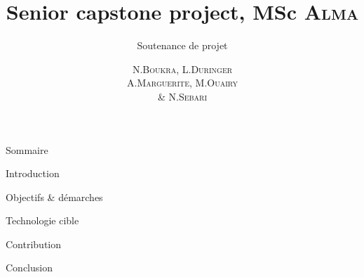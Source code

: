 \documentclass[HeilHazel,pdf,final,colorBG,slideColor]{prosper}
\title{\vspace{-0,5cm}Senior capstone project, MSc \textsc{Alma}}
\subtitle{Soutenance de projet}
\author{N.\textsc{Boukra}, L.\textsc{Duringer}\\
  A.\textsc{Marguerite},  M.\textsc{Ouairy}\\
  \& N.\textsc{Sebari}}
\begin{document}
\maketitle
\newcommand{\bc}{\begin{center}} 
\newcommand{\ec}{\end{center}} 
\newcommand{\bi}{\begin{Itemize}} 
\newcommand{\ei}{\end{Itemize}} 
\newcommand{\myitemm}{\item \texttt{[image: green-bullet-on-white]}}
\newcommand{\icongb}{\texttt{[image: green-bullet-on-white]}} 
\newcommand{\iconrb}{\texttt{[image: red-bullet-on-white]}} 

\newcommand{\itemg}{\item[\icongb{}]}
\newcommand{\itemr}{\item[\iconrb{}]}


\begin{slide}{Sommaire}
  \begin{enumerate}
    {\bf
    \item Introduction
      \vspace{.5cm}
    \item Objectifs \& démarches
      \vspace{.5cm}
    \item Technologie cible  
      \vspace{.5cm}
    \item Contribution
      \vspace{.5cm}
    \item Conclusion}
  \end{enumerate}
\end{slide}
\end{document}
